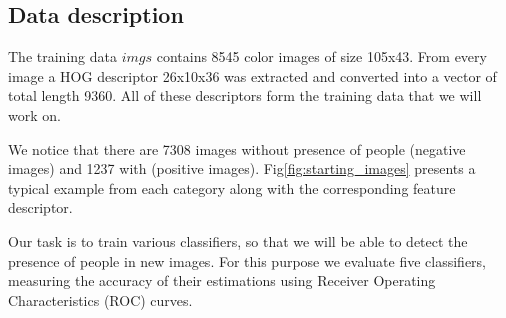 \subsection{Data description}
The training data $imgs$ contains 8545 color images of size 105x43. From every image a HOG descriptor 26x10x36 was extracted and converted into a vector of total length 9360. All of these descriptors form the training data that we will work on. 

\noindent We notice that there are 7308 images without presence of people (negative images) and 1237 with (positive images). Fig\ref{fig:starting_images} presents a typical example from each category along with the corresponding feature descriptor.

\noindent Our task is to train various classifiers, so that we will be able to detect the presence of people in new images. For this purpose we evaluate five classifiers, measuring the accuracy of their estimations using Receiver Operating Characteristics (ROC) curves.

